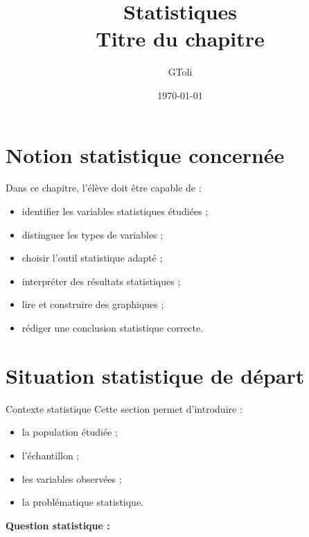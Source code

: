 \documentclass[11pt,a4paper]{article}
\title{\textbf{Statistiques}\\[0.2cm]
\large Titre du chapitre}
\author{GToli}
\date{\today}
\begin{document}
\maketitle

\section{Notion statistique concernée}

\begin{cadreobjectif}
Dans ce chapitre, l’élève doit être capable de :
\begin{itemize}
    \item identifier les variables statistiques étudiées ;
    \item distinguer les types de variables ;
    \item choisir l’outil statistique adapté ;
    \item interpréter des résultats statistiques ;
    \item lire et construire des graphiques ;
    \item rédiger une conclusion statistique correcte.
\end{itemize}
\end{cadreobjectif}

\section{Situation statistique de départ}

\begin{cadrebleu}{Contexte statistique}
Cette section permet d’introduire :
\begin{itemize}
    \item la population étudiée ;
    \item l’échantillon ;
    \item les variables observées ;
    \item la problématique statistique.
\end{itemize}

\medskip

\textbf{Question statistique :}

\dotfill
\end{cadrebleu}

\end{document}
